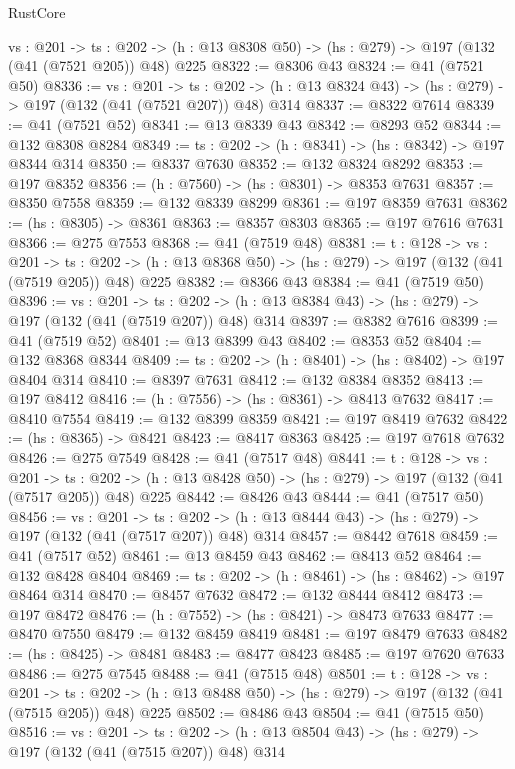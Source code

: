 \begin{lexlean}{RustCore}
\begin{coremodule}
  {vs : @201} ->
  {ts : @202} -> (h : @13 @8308 @50) -> (hs : @279) -> @197 (@132 (@41 (@7521 @205)) @48) @225
@8322 := @8306 @43
@8324 := @41 (@7521 @50)
@8336 := {vs : @201} ->
  {ts : @202} -> (h : @13 @8324 @43) -> (hs : @279) -> @197 (@132 (@41 (@7521 @207)) @48) @314
@8337 := @8322 @7614
@8339 := @41 (@7521 @52)
@8341 := @13 @8339 @43
@8342 := @8293 @52
@8344 := @132 @8308 @8284
@8349 := {ts : @202} -> (h : @8341) -> (hs : @8342) -> @197 @8344 @314
@8350 := @8337 @7630
@8352 := @132 @8324 @8292
@8353 := @197 @8352
@8356 := (h : @7560) -> (hs : @8301) -> @8353 @7631
@8357 := @8350 @7558
@8359 := @132 @8339 @8299
@8361 := @197 @8359 @7631
@8362 := (hs : @8305) -> @8361
@8363 := @8357 @8303
@8365 := @197 @7616 @7631
@8366 := @275 @7553
@8368 := @41 (@7519 @48)
@8381 := {t : @128} ->
  {vs : @201} ->
  {ts : @202} -> (h : @13 @8368 @50) -> (hs : @279) -> @197 (@132 (@41 (@7519 @205)) @48) @225
@8382 := @8366 @43
@8384 := @41 (@7519 @50)
@8396 := {vs : @201} ->
  {ts : @202} -> (h : @13 @8384 @43) -> (hs : @279) -> @197 (@132 (@41 (@7519 @207)) @48) @314
@8397 := @8382 @7616
@8399 := @41 (@7519 @52)
@8401 := @13 @8399 @43
@8402 := @8353 @52
@8404 := @132 @8368 @8344
@8409 := {ts : @202} -> (h : @8401) -> (hs : @8402) -> @197 @8404 @314
@8410 := @8397 @7631
@8412 := @132 @8384 @8352
@8413 := @197 @8412
@8416 := (h : @7556) -> (hs : @8361) -> @8413 @7632
@8417 := @8410 @7554
@8419 := @132 @8399 @8359
@8421 := @197 @8419 @7632
@8422 := (hs : @8365) -> @8421
@8423 := @8417 @8363
@8425 := @197 @7618 @7632
@8426 := @275 @7549
@8428 := @41 (@7517 @48)
@8441 := {t : @128} ->
  {vs : @201} ->
  {ts : @202} -> (h : @13 @8428 @50) -> (hs : @279) -> @197 (@132 (@41 (@7517 @205)) @48) @225
@8442 := @8426 @43
@8444 := @41 (@7517 @50)
@8456 := {vs : @201} ->
  {ts : @202} -> (h : @13 @8444 @43) -> (hs : @279) -> @197 (@132 (@41 (@7517 @207)) @48) @314
@8457 := @8442 @7618
@8459 := @41 (@7517 @52)
@8461 := @13 @8459 @43
@8462 := @8413 @52
@8464 := @132 @8428 @8404
@8469 := {ts : @202} -> (h : @8461) -> (hs : @8462) -> @197 @8464 @314
@8470 := @8457 @7632
@8472 := @132 @8444 @8412
@8473 := @197 @8472
@8476 := (h : @7552) -> (hs : @8421) -> @8473 @7633
@8477 := @8470 @7550
@8479 := @132 @8459 @8419
@8481 := @197 @8479 @7633
@8482 := (hs : @8425) -> @8481
@8483 := @8477 @8423
@8485 := @197 @7620 @7633
@8486 := @275 @7545
@8488 := @41 (@7515 @48)
@8501 := {t : @128} ->
  {vs : @201} ->
  {ts : @202} -> (h : @13 @8488 @50) -> (hs : @279) -> @197 (@132 (@41 (@7515 @205)) @48) @225
@8502 := @8486 @43
@8504 := @41 (@7515 @50)
@8516 := {vs : @201} ->
  {ts : @202} -> (h : @13 @8504 @43) -> (hs : @279) -> @197 (@132 (@41 (@7515 @207)) @48) @314

\end{coremodule}
\end{lexlean}
